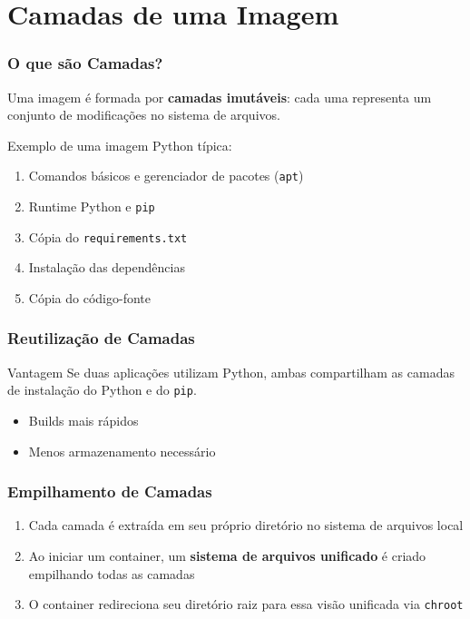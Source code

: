 \section{Camadas de uma Imagem}

\begin{frame}
  \frametitle{O que são Camadas?}
  Uma imagem é formada por \textbf{camadas imutáveis}: cada uma representa
  um conjunto de modificações no sistema de arquivos.

  \vspace{0.5em}
  Exemplo de uma imagem Python típica:
  \begin{enumerate}
    \item Comandos básicos e gerenciador de pacotes (\texttt{apt})
    \item Runtime Python e \texttt{pip}
    \item Cópia do \texttt{requirements.txt}
    \item Instalação das dependências
    \item Cópia do código-fonte
  \end{enumerate}
\end{frame}

\begin{frame}
  \frametitle{Reutilização de Camadas}
  \begin{block}{Vantagem}
    Se duas aplicações utilizam Python, ambas compartilham as camadas
    de instalação do Python e do \texttt{pip}.
  \end{block}

  \vspace{0.5em}
  \begin{itemize}
    \item Builds mais rápidos
    \item Menos armazenamento necessário
  \end{itemize}
\end{frame}

\begin{frame}
  \frametitle{Empilhamento de Camadas}
  \begin{enumerate}
    \item Cada camada é extraída em seu próprio diretório no sistema de arquivos local
    \item Ao iniciar um container, um \textbf{sistema de arquivos unificado} é criado
          empilhando todas as camadas
    \item O container redireciona seu diretório raiz para essa visão unificada via \texttt{chroot}
  \end{enumerate}
\end{frame}

